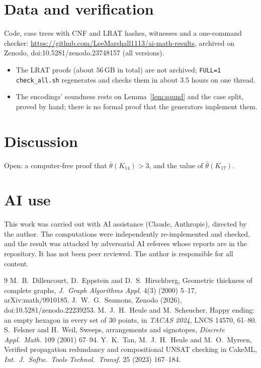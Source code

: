 \documentclass[11pt]{article}
\begin{document}
\section{Data and verification}
Code, case trees with CNF and LRAT hashes, witnesses and a one-command checker: \url{https://github.com/LeeMarshall1113/ai-math-results}, archived on Zenodo, doi:10.5281/zenodo.23748157 (all versions).
\begin{itemize}
\item The LRAT proofs (about $56$\,GB in total) are not archived; \texttt{FULL=1 check\_all.sh} regenerates and
  checks them in about $3.5$ hours on one thread.
\item The encodings' soundness rests on Lemma~\ref{lem:sound} and the case split, proved by hand; there is no formal
  proof that the generators implement them.
\end{itemize}

\section{Discussion}
Open: a computer-free proof that $\bar\theta(K_{14})>3$, and the value of $\bar\theta(K_{17})$.

\section*{AI use}
This work was carried out with AI assistance (Claude, Anthropic), directed by the author. The computations were
independently re-implemented and checked, and the result was attacked by adversarial AI referees whose reports are
in the repository. It has not been peer reviewed. The author is responsible for all content.

\begin{thebibliography}{9}
 M.~B.~Dillencourt, D.~Eppstein and D.~S.~Hirschberg, Geometric thickness of complete graphs,
  \emph{J.\ Graph Algorithms Appl.} 4(3) (2000) 5--17, arXiv:math/9910185.
 J.~W.~G.~Seamons, Zenodo (2026), doi:10.5281/zenodo.22239253.
 M.~J.~H.~Heule and M.~Scheucher, Happy ending: an empty hexagon in every set of 30 points, in
  \emph{TACAS 2024}, LNCS 14570, 61--80.
 S.~Felsner and H.~Weil, Sweeps, arrangements and signotopes, \emph{Discrete Appl.\ Math.} 109 (2001)
  67--94.
 Y.~K.~Tan, M.~J.~H.~Heule and M.~O.~Myreen, Verified propagation redundancy and compositional UNSAT
  checking in CakeML, \emph{Int.\ J.\ Softw.\ Tools Technol.\ Transf.} 25 (2023) 167--184.
\end{thebibliography}
\end{document}

